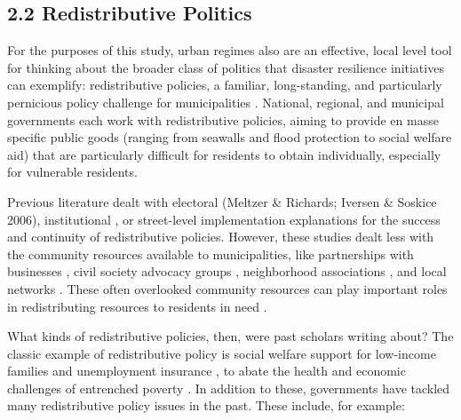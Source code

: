 \documentclass[preprint, 3p,
authoryear]{elsarticle} %
\begin{document}
\hypertarget{redistributive-politics}{%
\subsection{2.2 Redistributive Politics}\label{redistributive-politics}}

For the purposes of this study, urban regimes also are an effective,
local level tool for thinking about the broader class of politics that
disaster resilience initiatives can exemplify: redistributive policies,
a familiar, long-standing, and particularly pernicious policy challenge
for municipalities
\citep{meltzer_and_scott_1981, pierson_1994, hacker_2004, iversen_and_soskice_2006, mettler_2011, rueda_and_stemueller_2019}.
National, regional, and municipal governments each work with
redistributive policies, aiming to provide en masse specific public
goods (ranging from seawalls and flood protection to social welfare aid)
that are particularly difficult for residents to obtain individually,
especially for vulnerable residents.

Previous literature dealt with electoral (Meltzer \& Richards; Iversen
\& Soskice 2006), institutional
\citep{pierson_1994, hacker_2004, mettler_2011}, or street-level
implementation \citep{lipsky_1980, hupe_and_hill_2007} explanations for
the success and continuity of redistributive policies. However, these
studies dealt less with the community resources available to
municipalities, like partnerships with businesses
\citep{stone_1989, mossberger_and_stoker_2001}, civil society advocacy
groups \citep{portney_and_berry_2016}, neighborhood associations
\citep{logan_and_rabrenovic_1990}, and local networks
\citep{aldrich_and_meyer_2015}. These often overlooked community
resources can play important roles in redistributing resources to
residents in need \citep{aldrich_and_kioyta_2017, klinenberg_2018}.

What kinds of redistributive policies, then, were past scholars writing
about? The classic example of redistributive policy is social welfare
support for low-income families and unemployment insurance
\citep{pierson_1994, hacker_2004}, to abate the health and economic
challenges of entrenched poverty
\citep{ahammer_packham_2020, berkowitz_and_basu_2021}. In addition to
these, governments have tackled many redistributive policy issues in the
past. These include, for example:
\end{document}
